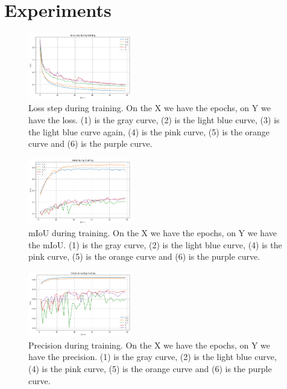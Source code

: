 \documentclass[conference]{IEEEtran}
\begin{document}
\section{Experiments}

\begin{figure}[tp]
\centerline{\includegraphics[width=0.4\textwidth]{figures/loss}}
\caption{Loss step during training. On the X we have the epochs, on Y we have the loss. (1) is the gray curve, (2) is the light blue
curve, (3) is the light blue curve again, (4) is the pink curve, (5) is the orange curve and (6) is the purple curve.}
\label{loss_steps}
\end{figure}

\begin{figure}[tp]
\centerline{\includegraphics[width=0.4\textwidth]{figures/miou}}
\caption{mIoU during training. On the X we have the epochs, on Y we have the mIoU. (1) is the gray curve, (2) is the light blue
curve, (4) is the pink curve, (5) is the orange curve and (6) is the purple curve.}
\label{miou}
\end{figure}

\begin{figure}[tp]
\centerline{\includegraphics[width=0.4\textwidth]{figures/precision}}
\caption{Precision during training. On the X we have the epochs, on Y we have the precision. (1) is the gray curve, (2) is the light blue
curve, (4) is the pink curve, (5) is the orange curve and (6) is the purple curve.}
\label{precision}
\end{figure}
\end{document}
